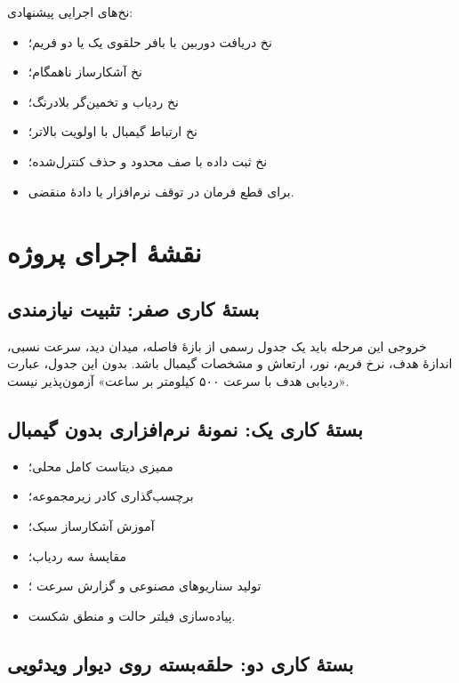 \documentclass[12pt,a4paper]{article}
\newcommand{\EN}[1]{\lr{#1}}
\begin{document}
نخ‌های اجرایی پیشنهادی:

\begin{itemize}
    \item نخ دریافت دوربین با بافر حلقوی یک یا دو فریم؛
    \item نخ آشکارساز ناهمگام؛
    \item نخ ردیاب و تخمین‌گر بلادرنگ؛
    \item نخ ارتباط گیمبال با اولویت بالاتر؛
    \item نخ ثبت داده با صف محدود و حذف کنترل‌شده؛
    \item \EN{watchdog} برای قطع فرمان در توقف نرم‌افزار یا دادهٔ منقضی.
\end{itemize}

\section{نقشهٔ اجرای پروژه}

\subsection{بستهٔ کاری صفر: تثبیت نیازمندی}

خروجی این مرحله باید یک جدول رسمی از بازهٔ فاصله، میدان دید، سرعت نسبی، اندازهٔ هدف، نرخ فریم، نور، ارتعاش و مشخصات گیمبال باشد. بدون این جدول، عبارت «ردیابی هدف با سرعت ۵۰۰ کیلومتر بر ساعت» آزمون‌پذیر نیست.

\subsection{بستهٔ کاری یک: نمونهٔ نرم‌افزاری بدون گیمبال}

\begin{itemize}
    \item ممیزی دیتاست کامل محلی؛
    \item برچسب‌گذاری کادر زیرمجموعه؛
    \item آموزش آشکارساز سبک؛
    \item مقایسهٔ سه ردیاب؛
    \item تولید سناریوهای مصنوعی و گزارش سرعت \EN{CPU-only}؛
    \item پیاده‌سازی فیلتر حالت و منطق شکست.
\end{itemize}

\subsection{بستهٔ کاری دو: حلقه‌بسته روی دیوار ویدئویی}
\end{document}
